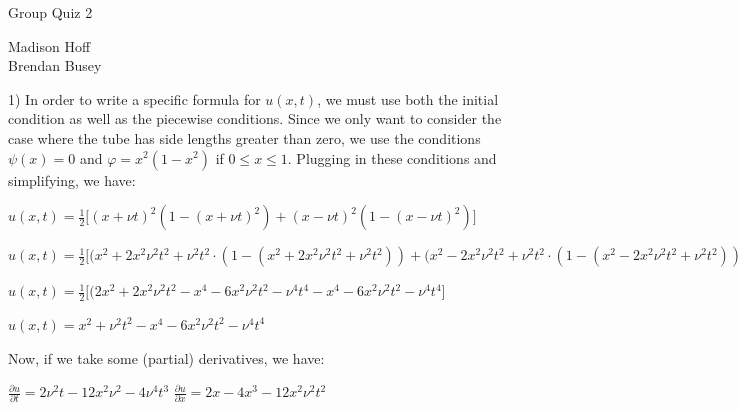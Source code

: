 \documentclass[executivepaper]{article}
\begin{document}
\begin{center}

Group Quiz 2

\end{center}

\begin{flushright}

Madison Hoff \\

Brendan Busey

\end{flushright}

\begin{flushleft}

1) In order to write a specific formula for $u(x,t)$, we must use both the initial condition as well as the piecewise conditions. Since we only want to consider the case where the tube has side lengths greater than zero, we use the conditions $\psi(x)=0$ and $\varphi=x^2(1-x^2)$ if $0 \leq x \leq 1$. Plugging in these conditions and simplifying, we have:

\begin{center}

$u(x,t)=\frac{1}{2} \bigg[(x+\nu t)^2(1-(x+\nu t)^2)+(x-\nu t)^2(1-(x-\nu t)^2)\bigg]$

\vspace{3mm}

$u(x,t)=\frac{1}{2} \bigg[(x^2+2x^2\nu^2t^2+\nu^2t^2 \cdot (1-(x^2+2x^2\nu^2t^2+\nu^2t^2))+(x^2-2x^2\nu^2t^2+\nu^2t^2 \cdot (1-(x^2-2x^2\nu^2t^2+\nu^2t^2))\bigg]$

\vspace{3mm}

$u(x,t)=\frac{1}{2} \bigg[(2x^2+2x^2\nu^2t^2-x^4-6x^2\nu^2t^2-\nu^4t^4-x^4-6x^2\nu^2t^2-\nu^4t^4\bigg]$

\vspace{3mm}

$u(x,t)=x^2+\nu^2t^2-x^4-6x^2\nu^2t^2-\nu^4t^4$

\end{center}

\vspace{3mm}

Now, if we take some (partial) derivatives, we have:

\begin{center}

$\frac{\partial u}{\partial t}=2\nu^2t-12x^2\nu^2-4\nu^4t^3$ \quad \quad $\frac{\partial u}{\partial x}=2x-4x^3-12x^2\nu^2t^2$

\vspace{3mm}


\end{center}
\end{flushleft}
\end{document}
